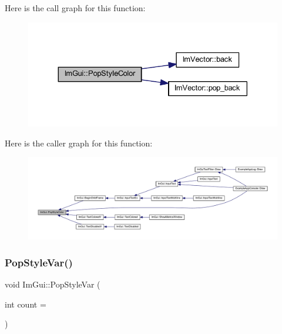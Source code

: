 Here is the call graph for this function\+:
\nopagebreak
\begin{figure}[H]
\begin{center}
\leavevmode
\includegraphics[width=330pt]{namespace_im_gui_a9795f730b4043a98b6254738d86efcdc_cgraph}
\end{center}
\end{figure}
Here is the caller graph for this function\+:
\nopagebreak
\begin{figure}[H]
\begin{center}
\leavevmode
\includegraphics[width=350pt]{namespace_im_gui_a9795f730b4043a98b6254738d86efcdc_icgraph}
\end{center}
\end{figure}
\mbox{\label{namespace_im_gui_a14116e57d81e326adef2a702e65781d4}} 
\subsubsection{\texorpdfstring{Pop\+Style\+Var()}{PopStyleVar()}}
{\footnotesize\ttfamily void Im\+Gui\+::\+Pop\+Style\+Var (\begin{DoxyParamCaption}\item[{int}]{count = {} }\end{DoxyParamCaption})}

